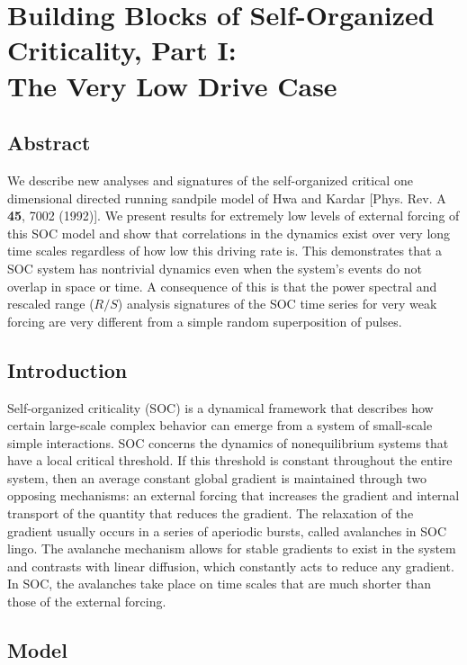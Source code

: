 \chapter{Building Blocks of Self-Organized Criticality, Part I: \\
The Very Low Drive Case}
\label{sec:partI}

\bigskip

\section*{Abstract}
\label{sec:partI_abstract}
We describe new analyses and signatures of the self-organized critical
one dimensional directed running sandpile model of Hwa and Kardar
[Phys. Rev. A {\bf 45}, 7002 (1992)].  We present results for
extremely low levels of external forcing of this SOC model and show
that correlations in the dynamics exist over very long time scales
regardless of how low this driving rate is.  This demonstrates that a
SOC system has nontrivial dynamics even when the system's events do
not overlap in space or time.  A consequence of this is that the power
spectral and rescaled range ($R/S$) analysis signatures of the SOC
time series for very weak forcing are very different from a simple
random superposition of pulses.

\section{Introduction}
\label{sec:partI_introduction}

Self-organized criticality (SOC) \cite{btw87a,btw88a} is a dynamical
framework that describes how certain large-scale complex behavior can
emerge from a system of small-scale simple interactions.  SOC concerns
the dynamics of nonequilibrium systems that have a local critical
threshold.  If this threshold is constant throughout the entire
system, then an average constant global gradient is maintained through
two opposing mechanisms: an external forcing that increases the
gradient and internal transport of the quantity that reduces the
gradient.  The relaxation of the gradient usually occurs in a series
of aperiodic bursts, called avalanches in SOC lingo.  The avalanche
mechanism allows for stable gradients to exist in the system and
contrasts with linear diffusion, which constantly acts to reduce any
gradient.  In SOC, the avalanches take place on time scales that are
much shorter than those of the external forcing.

\section{Model}
\label{sec:partI_one-dimens-runn}

